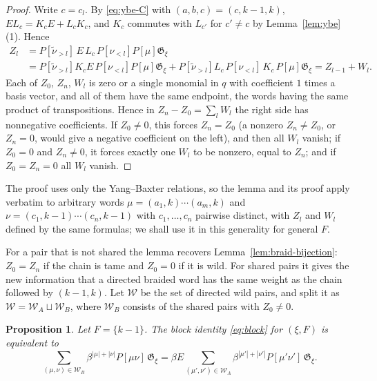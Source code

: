 \documentclass[11pt]{article}
\newtheorem{proposition}{Proposition}
\newcommand{\G}{\mathfrak{G}}
\begin{document}
\begin{proof}
Write $c=c_l$. By \eqref{eq:ybe-C} with $(a,b,c)=(c,k-1,k)$,
$EL_c=K_cE+L_cK_c$, and $K_c$ commutes with $L_{c'}$ for $c'\neq c$ by
Lemma~\ref{lem:ybe}(1). Hence
\begin{align*}
 Z_l&=P[\tilde\nu_{>l}]\,E\,L_c\,P[\nu_{<l}]P[\mu]\G_\xi\\
 &=P[\tilde\nu_{>l}]K_cE\,P[\nu_{<l}]P[\mu]\G_\xi
  +P[\tilde\nu_{>l}]L_c\,P[\nu_{<l}]\,K_c\,P[\mu]\G_\xi
 =Z_{l-1}+W_l .
\end{align*}
Each of $Z_0$, $Z_n$, $W_l$ is zero or a single monomial in $q$ with
coefficient $1$ times a basis vector, and all of them have the same
endpoint, the words having the same product of transpositions. Hence
in $Z_n-Z_0=\sum_lW_l$ the right side has nonnegative coefficients.
If $Z_0\neq0$, this forces $Z_n=Z_0$ (a nonzero $Z_n\neq Z_0$, or
$Z_n=0$, would give a negative coefficient on the left), and then all
$W_l$ vanish; if $Z_0=0$ and $Z_n\neq0$, it forces exactly one $W_l$
to be nonzero, equal to $Z_n$; and if $Z_0=Z_n=0$ all $W_l$ vanish.
\end{proof}

The proof uses only the Yang--Baxter relations, so the lemma and its
proof apply verbatim to arbitrary words $\mu=(a_1,k)\cdots(a_m,k)$ and
$\nu=(c_1,k-1)\cdots(c_n,k-1)$ with $c_1,\ldots,c_n$ pairwise
distinct, with $Z_l$ and $W_l$ defined by the same formulas; we shall
use it in this generality for general $F$.

For a pair that is not shared the lemma recovers
Lemma~\ref{lem:braid-bijection}: $Z_0=Z_n$ if the chain is tame and
$Z_0=0$ if it is wild. For shared pairs it gives the new information
that a directed braided word has the same weight as the chain followed
by $(k-1,k)$. Let $\mathcal W$ be the set of directed wild pairs, and
split it as $\mathcal W=\mathcal W_A\sqcup\mathcal W_B$, where
$\mathcal W_B$ consists of the shared pairs with $Z_0\neq0$.

\begin{proposition}\label{prop:F-minimal}
Let $F=\{k-1\}$. The block identity \eqref{eq:block} for $(\xi,F)$ is
equivalent to
\begin{equation}\label{eq:star}
 \sum_{(\mu,\nu)\in\mathcal W_B}\beta^{|\mu|+|\nu|}P[\mu\nu]\,\G_\xi
 =\beta E\sum_{(\mu',\nu')\in\mathcal W_A}\beta^{|\mu'|+|\nu'|}P[\mu'\nu']\,\G_\xi .
\end{equation}
\end{proposition}
\end{document}
